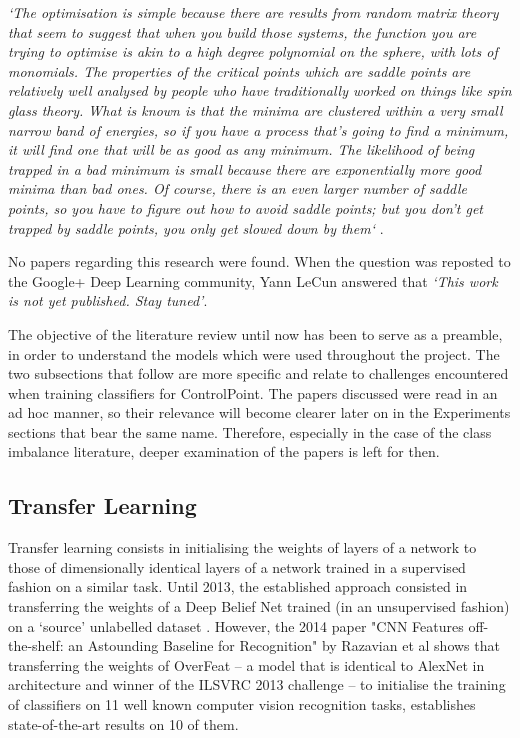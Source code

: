 \documentclass[a4paper,11pt]{article}
\begin{document}
\textit{`The optimisation is simple because there are results from random matrix theory that seem to suggest that when you build those systems, the function you are trying to optimise is akin to a high degree polynomial on the sphere, with lots of monomials. The properties of the critical points which are saddle points are relatively well analysed by people who have traditionally worked on things like spin glass theory. What is known is that the minima are clustered within a very small narrow band of energies, so if you have a process that's going to find a minimum, it will find one that will be as good as any minimum. The likelihood of being trapped in a bad minimum is small because there are exponentially more good minima than bad ones. Of course, there is an even larger number of saddle points, so you have to figure out how to avoid saddle points; but you don't get trapped by saddle points, you only get slowed down by them`} \cite{labex-bezout}.

No papers regarding this research were found. When the question was reposted to the Google+ Deep Learning community, Yann LeCun answered that \textit{`This work is not yet published. Stay tuned'}.

\clearpage

The objective of the literature review until now has been to serve as a preamble, in order to understand the models which were used throughout the project. The two subsections that follow are more specific and relate to challenges encountered when training classifiers for ControlPoint. The papers discussed were read in an ad hoc manner, so their relevance will become clearer later on in the Experiments sections that bear the same name. Therefore, especially in the case of the class imbalance literature, deeper examination of the papers is left for then. \\

\subsection{Transfer Learning}

Transfer learning consists in initialising the weights of layers of a network to those of dimensionally identical layers of a network trained in a supervised fashion on a similar task. Until 2013, the established approach consisted in transferring the weights of a Deep Belief Net trained (in an unsupervised fashion) on a `source' unlabelled dataset \cite{microsoft-book}. However, the 2014 paper "CNN Features off-the-shelf: an Astounding Baseline for Recognition" by Razavian et al shows that transferring the weights of OverFeat -- a model that is identical to AlexNet in architecture and winner of the ILSVRC 2013 challenge \cite{transfer-learning} -- to initialise the training of classifiers on 11 well known computer vision recognition tasks, establishes state-of-the-art results on 10 of them\cite{off-the-shelf}.
\end{document}
